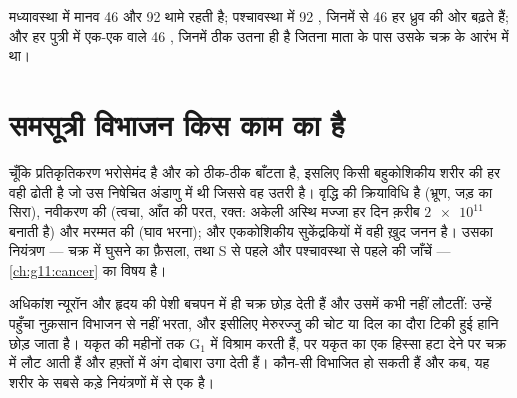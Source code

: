 \begin{example}[मानव के अंक]\label{ex:g11:cell-cycle-mitosis:human}
मध्यावस्था में मानव  46  और 92  थामे रहती है;
पश्चावस्था में 92 , जिनमें से 46 हर ध्रुव की ओर बढ़ते हैं; और हर
पुत्री में एक-एक  वाले 46 , जिनमें ठीक उतना ही  है
जितना माता के पास उसके चक्र के आरंभ में था।
\end{example}

\section{समसूत्री विभाजन किस काम का है}

\begin{proposition}\label{prop:g11:cell-cycle-mitosis:conformity}
चूँकि प्रतिकृतिकरण भरोसेमंद है और   को ठीक-ठीक
बाँटता है, इसलिए किसी बहुकोशिकीय शरीर की हर  वही 
ढोती है जो उस निषेचित अंडाणु में थी जिससे वह उतरी है। 
वृद्धि की क्रियाविधि है (भ्रूण, जड़ का सिरा), नवीकरण की (त्वचा, आँत की
परत, रक्त: अकेली अस्थि मज्जा हर दिन क़रीब $\num{2e11}$  बनाती है)
और मरम्मत की (घाव भरना); और एककोशिकीय सुकेंद्रकियों में वही ख़ुद जनन है।
उसका नियंत्रण --- चक्र में घुसने का फ़ैसला, तथा S से पहले और पश्चावस्था
से पहले की जाँचें --- \cref{ch:g11:cancer} का विषय है।
\end{proposition}
\admitted

\begin{remark}[हर चीज़ विभाजित नहीं होती]\label{rem:g11:cell-cycle-mitosis:notall}
अधिकांश न्यूरॉन और हृदय की पेशी  बचपन में ही चक्र छोड़ देती हैं
और उसमें कभी नहीं लौटतीं: उन्हें पहुँचा नुक़सान विभाजन से नहीं भरता, और
इसीलिए मेरुरज्जु की चोट या दिल का दौरा टिकी हुई हानि छोड़ जाता है। यकृत
की  महीनों तक $\mathrm{G_1}$ में विश्राम करती हैं, पर यकृत का एक
हिस्सा हटा देने पर चक्र में लौट आती हैं और हफ़्तों में अंग दोबारा उगा देती
हैं। कौन-सी  विभाजित हो सकती हैं और कब, यह शरीर के सबसे कड़े
नियंत्रणों में से एक है।
\end{remark}

